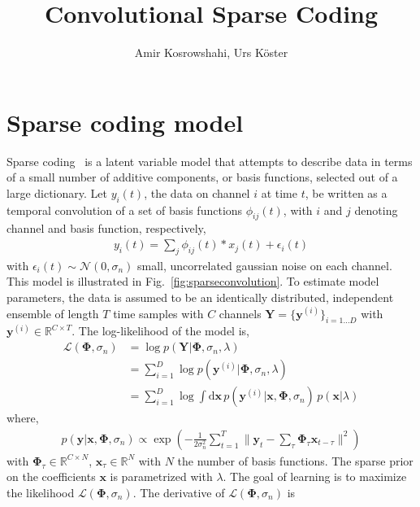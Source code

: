 \documentclass[10pt]{article}
\author{Amir Kosrowshahi, Urs K\"oster}
\title{Convolutional Sparse Coding}
\newcommand{\mb}{\mathbf}
\newcommand{\norm}[1]{\lVert#1\rVert}
\begin{document}
\maketitle

\section{Sparse coding model}
\label{sec:sparsealg}

Sparse coding~\cite{Olshausen96,olshausen2003learning,Smith:2006qf} is
a latent variable model that attempts to describe data in terms of a
small number of additive components, or basis functions, selected out
of a large dictionary. Let $y_i(t)$, the data on channel $i$ at time
$t$, be written as a temporal convolution of a set of basis functions
$\phi_{ij}(t)$, with $i$ and $j$ denoting channel and basis function,
respectively,
\begin{align}
y_i(t) = \sum_j \phi_{ij}(t) * x_j(t) + \epsilon_{i}(t) \label{eqn:conv}
\end{align}
with $\epsilon_i(t) \sim \mathcal{N}(0,\sigma_n)$ small, uncorrelated
gaussian noise on each channel. This model is illustrated in
Fig.~\ref{fig:sparseconvolution}. To estimate model parameters, the
data is assumed to be an identically distributed, independent ensemble
of length $T$ time samples with $C$ channels $\mb{Y} =
\{\mb{y}^{(i)}\}_{i=1\ldots D}$ with $\mb{y}^{(i)} \in \mathbb{R}^{C
  \times T}$. The log-likelihood of the model is,
\begin{align*}
\mathcal{L}(\mb{\Phi}, \sigma_n)
&= \log p(\mb{Y} | \mb{\Phi}, \sigma_n, \lambda) \\
&= \sum_{i=1}^D \log p(\mb{y}^{(i)} | \mb{\Phi}, \sigma_n, \lambda) \\
&= \sum_{i=1}^D \log \int \mathrm{d} \mb{x} \, p(\mb{y}^{(i)}
| \mb{x}, \mb{\Phi}, \sigma_n) \, p(\mb{x} | \lambda)
\end{align*}
where,
\begin{align*}
  p(\mb{y} | \mb{x}, \mb{\Phi}, \sigma_n) \propto
  \exp\left(-\frac{1}{2 \sigma_n^2} \sum_{t=1}^T \norm{\mb{y}_t -
      \sum_\tau \mb{\Phi}_\tau \mb{x}_{t-\tau}}^2\right)
\end{align*}
with $\mb{\Phi}_\tau \in \mathbb{R}^{C \times N}$, $\mb{x}_\tau \in
\mathbb{R}^N$ with $N$ the number of basis functions. The sparse prior
on the coefficients $\mb{x}$ is parametrized with $\lambda$. The goal
of learning is to maximize the likelihood $\mathcal{L}(\mb{\Phi},
\sigma_n)$. The derivative of $\mathcal{L}(\mb{\Phi}, \sigma_n)$ is
\end{document}
